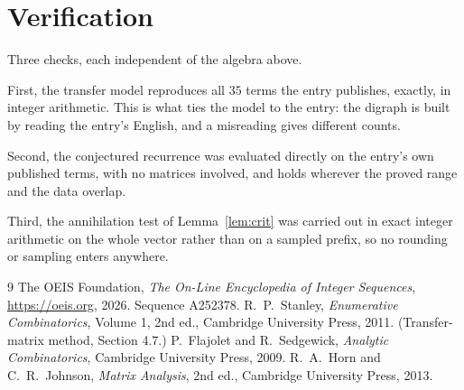 \documentclass[11pt,a4paper]{article}
\theoremstyle{plain}
\theoremstyle{definition}
\begin{document}
\section{Verification}

Three checks, each independent of the algebra above.

First, the transfer model reproduces all $35$ terms the entry publishes, exactly, in
integer arithmetic. This is what ties the model to the entry: the digraph is built by reading
the entry's English, and a misreading gives different counts.

Second, the conjectured recurrence was evaluated directly on the entry's own published terms,
with no matrices involved, and holds wherever the proved range and the data overlap.

Third, the annihilation test of Lemma~\ref{lem:crit} was carried out in exact integer
arithmetic on the whole vector rather than on a sampled prefix, so no rounding or sampling
enters anywhere.

\begin{thebibliography}{9}
 The OEIS Foundation, \emph{The On-Line Encyclopedia of Integer
Sequences}, \url{https://oeis.org}, 2026. Sequence A252378.
 R.~P.~Stanley, \emph{Enumerative Combinatorics}, Volume 1, 2nd ed.,
Cambridge University Press, 2011. (Transfer-matrix method, Section 4.7.)
 P.~Flajolet and R.~Sedgewick, \emph{Analytic Combinatorics}, Cambridge
University Press, 2009.
 R.~A.~Horn and C.~R.~Johnson, \emph{Matrix Analysis}, 2nd ed., Cambridge
University Press, 2013.
\end{thebibliography}
\end{document}
